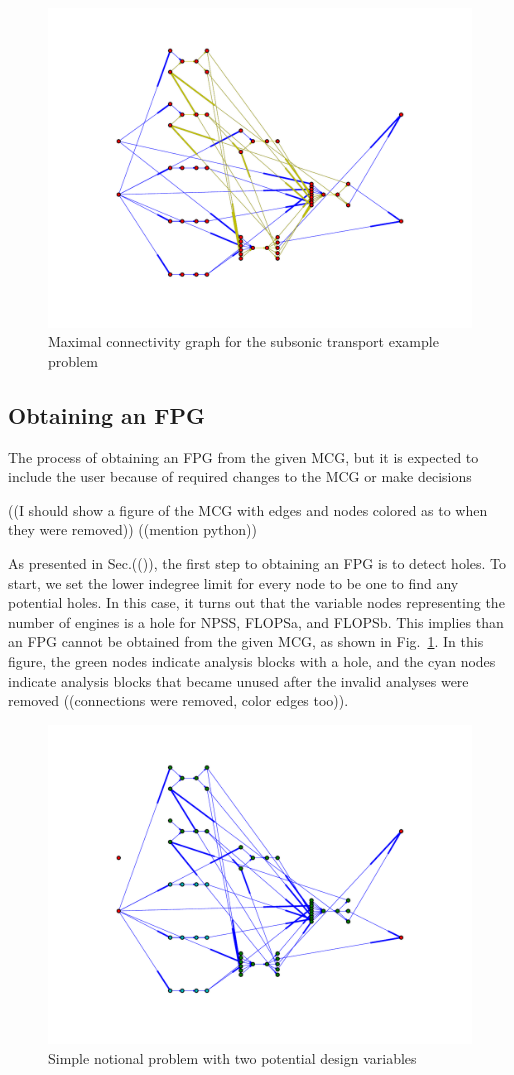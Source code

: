 \begin{figure}[htb!]
  \begin{center}
    \includegraphics[width=.6\textwidth]{images/MCG}
  \end{center}
  \caption{Maximal connectivity graph for the subsonic transport example problem}
\end{figure}

\subsection{Obtaining an FPG}
The process of obtaining an FPG from the given MCG, but it is expected to include the user because of required changes to the MCG or make decisions

((I should show a figure of the MCG with edges and nodes colored as to when they were removed))
((mention python))

As presented in Sec.(()), the first step to obtaining an FPG is to detect holes. To start, we set the lower indegree limit for every node to be one to find any potential holes. In this case, it turns out that the variable nodes representing the number of engines is a hole for NPSS, FLOPSa, and FLOPSb. This implies than an FPG cannot be obtained from the given MCG, as shown in Fig.~\ref{f:MCG nengines}. In this figure, the green nodes indicate analysis blocks with a hole, and the cyan nodes indicate analysis blocks that became unused after the invalid analyses were removed ((connections were removed, color edges too)).
\begin{figure}[htb!]
  \begin{center}
    \includegraphics[width=.6\textwidth]{images/MCG_nengines}
  \end{center}
  \caption{Simple notional problem with two potential design variables \label{f:design vars}}
\label{f:MCG nengines}
\end{figure}

